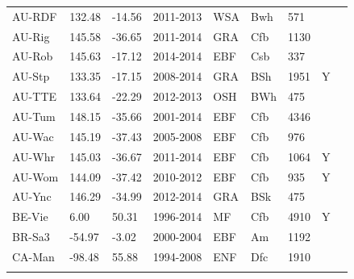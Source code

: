 \documentclass[gmd, manuscript]{copernicus}
\begin{document}
\begin{table}[t]
\begin{tabular}{lllllllll}
  AU-RDF & 132.48 & -14.56 & 2011-2013 & WSA & Bwh & 571 &  & \citet{AU-RDF} \\ 
  AU-Rig & 145.58 & -36.65 & 2011-2014 & GRA & Cfb & 1130 &  & \citet{AU-XXX} \\ 
  AU-Rob & 145.63 & -17.12 & 2014-2014 & EBF & Csb & 337 &  & \citet{AU-XXX} \\ 
  AU-Stp & 133.35 & -17.15 & 2008-2014 & GRA & BSh & 1951 & Y & \citet{AU-Stp} \\ 
  AU-TTE & 133.64 & -22.29 & 2012-2013 & OSH & BWh & 475 &  & \citet{AU-TTE} \\ 
  AU-Tum & 148.15 & -35.66 & 2001-2014 & EBF & Cfb & 4346 &  & \citet{AU-Tum} \\ 
  AU-Wac & 145.19 & -37.43 & 2005-2008 & EBF & Cfb & 976 &  & \citet{AU-Wac} \\ 
  AU-Whr & 145.03 & -36.67 & 2011-2014 & EBF & Cfb & 1064 & Y & \citet{AU-Whr} \\ 
  AU-Wom & 144.09 & -37.42 & 2010-2012 & EBF & Cfb & 935 & Y & \citet{AU-Wom} \\ 
  AU-Ync & 146.29 & -34.99 & 2012-2014 & GRA & BSk & 475 &  & \citet{AU-Ync} \\ 
  BE-Vie &   6.00 & 50.31 & 1996-2014 & MF & Cfb & 4910 & Y & \citet{BE-Vie} \\ 
  BR-Sa3 & -54.97 & -3.02 & 2000-2004 & EBF & Am & 1192 &  & \citet{BR-Sa3} \\ 
  CA-Man & -98.48 & 55.88 & 1994-2008 & ENF & Dfc & 1910 &  & \citet{CA-Man} \\ 
    \bottomhline
\end{tabular}
\label{tab:sites}
\end{table}
\clearpage
\end{document}
